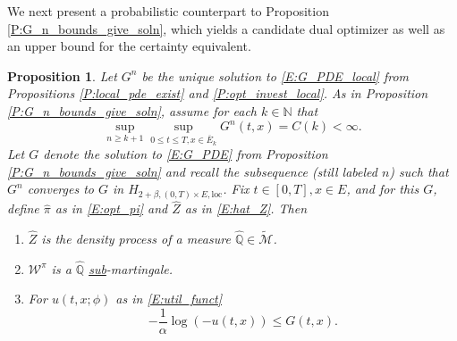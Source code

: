 \documentclass[11pt, letterpaper]{amsart}
\newtheorem{proposition}[theorem]{Proposition}
\theoremstyle{definition}
\theoremstyle{remark}
\numberwithin{equation}{section}
\newcommand{\nats}{\mathbb N}
\newcommand{\We}{\mathcal{W}}
\newcommand{\hz}{\hat{Z}}
\newcommand{\hqprob}{\hat{\qprob}}
\newcommand{\hpi}{\hat{\pi}}
\newcommand{\qprob}{\mathbb{Q}}
\newcommand{\tM}{\widetilde{\mathcal{M}}}
\newcommand{\ol}[1]{\overline{#1}}
\begin{document}
We next present a probabilistic counterpart to Proposition \ref{P:G_n_bounds_give_soln}, which yields a candidate dual optimizer as well as an upper bound for the certainty equivalent.

\begin{proposition}\label{P:unwind_prob_ub}
Let $G^n$ be the unique solution to \eqref{E:G_PDE_local} from Propositions \ref{P:local_pde_exist} and \ref{P:opt_invest_local}.  As in Proposition \ref{P:G_n_bounds_give_soln}, assume for each $k\in\nats$ that
\begin{equation}\label{E:G_n_loc_unif_ub_prob}
\sup_{n\geq k+1}\sup_{0\leq t\leq T, x\in \ol{E}_k} G^n(t,x) = C(k) < \infty.
\end{equation}
Let $G$ denote the solution to \eqref{E:G_PDE} from Proposition \ref{P:G_n_bounds_give_soln} and recall the subsequence (still labeled $n$) such that $G^n$ converges to $G$ in $H_{2+\beta,(0,T)\times E,\textrm{loc}}$. Fix $t\in[0,T], x\in E$, and for this $G$, define $\hpi$ as in \eqref{E:opt_pi} and $\hz$ as in \eqref{E:hat_Z}.  Then
\begin{enumerate}[(1)]
\item $\hz$ is the density process of a measure $\hqprob\in\tM$.
\item $\We^{\hpi}$ is a $\hqprob$ \underline{sub}-martingale.
\item For $u(t,x;\phi)$ as in \eqref{E:util_funct}
\begin{equation}\label{E:util_funct_ub}
-\frac{1}{\alpha}\log\left(-u(t,x)\right) \leq G(t,x).
\end{equation}
\end{enumerate}
\end{proposition}
\end{document}
